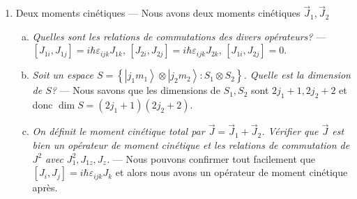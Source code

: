 \documentclass[10pt]{report}
\newcommand{\bra}[1]{\left<#1\right|}
\newcommand{\ket}[1]{\left|#1\right>}
\begin{document}
\begin{enumerate}[1)]
\begin{enumerate}[a)]
                Donc il suffit de montrer que $J_i \ket{\phi} \Rightarrow \bra{\psi}_i\ket{\phi} = 0$. Nous le montrons comme ($J_i = J_i^\dagger$ parce qu'il correspond \`a un observable)
                \begin{align}
                    \bra{\psi}J_i\ket{\phi} &= \bra{\phi}J_i^\dagger\ket{\psi}^*\\
                    &= \bra{\phi}J_i\ket{\psi}^* = 0
                \end{align}
                parce que $J_i\ket{\psi} \in S_1$. Autrement dit, $J_i$ ne change pas $j$ et tous les \'etats avec $j$ different sont orthogonals.
        \end{enumerate}
    \item Deux moments cin\'etiques --- Nous avons deux moments cin\'etiques $\vec{J}_1, \vec{J}_2$
        \begin{enumerate}[a)]
            \item \emph{Quelles sont les relations de commutations des divers op\'erateurs?} --- $\left[ J_{1i}, J_{1j} \right] = i\hbar \varepsilon_{ijk}J_{1k}$, $\left[ J_{2i}, J_{2j} \right] = i\hbar \varepsilon_{ijk}J_{2k}$, $\left[ J_{1i}, J_{2j} \right] = 0$. 
            \item \emph{Soit un espace $S=\left\{ \ket{j_1m_1}\otimes\ket{j_2m_2}: S_1\otimes S_2\right\}$. Quelle est la dimension de $S$?} --- Nous savons que les dimensions de $S_1, S_2$ sont $2j_1 + 1, 2j_2 + 2$ et donc $\dim S = \left( 2j_1 + 1 \right)\left( 2j_2 + 2 \right)$. 
            \item \emph{On d\'efinit le moment cin\'etique total par $\vec{J} = \vec{J}_1 + \vec{J}_2$. V\'erifier que $\vec{J}$ est bien un op\'erateur de moment cin\'etique et les relations de commutation de $J^2$ avec $J_1^2, J_{1z}, J_z$.} --- Nous pouvons confirmer tout facilement que $\left[ J_i, J_j \right] = i\hbar \varepsilon_{ijk}J_k$ et alors nous avons un op\'erateur de moment cin\'etique apr\`es.


\end{enumerate}
\end{enumerate}
\end{document}
